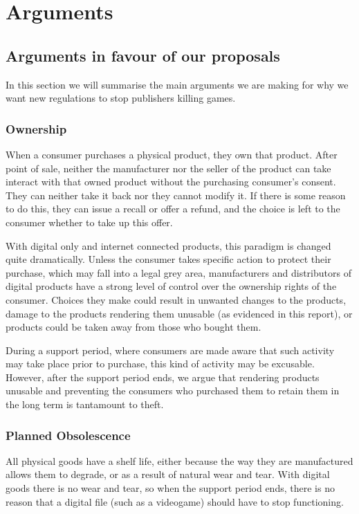 \chapter{Arguments}

\section{Arguments in favour of our proposals}
In this section we will summarise the main arguments we are making for why we want new regulations to stop publishers killing games.

\subsection{Ownership}
When a consumer purchases a physical product, they own that product.
After point of sale, neither the manufacturer nor the seller of the product can take interact with that owned product without the purchasing consumer's consent.
They can neither take it back nor they cannot modify it.
If there is some reason to do this, they can issue a recall or offer a refund, and the choice is left to the consumer whether to take up this offer.

With digital only and internet connected products, this paradigm is changed quite dramatically.
Unless the consumer takes specific action to protect their purchase,
which may fall into a legal grey area,
manufacturers and distributors of digital products have a strong level of control over the ownership rights of the consumer.
Choices they make could result in unwanted changes to the products\cn,
damage to the products rendering them unusable (as evidenced in this report),
or products could be taken away from those who bought them\cn.

During a support period, where consumers are made aware that such activity may take place prior to purchase, this kind of activity may be excusable.
However, after the support period ends, we argue that rendering products unusable and preventing the consumers who purchased them to retain them in the long term is tantamount to theft.

\subsection{Planned Obsolescence}
All physical goods have a shelf life, either because the way they are manufactured allows them to degrade, or as a result of natural wear and tear.
With digital goods there is no wear and tear, so when the support period ends, there is no reason that a digital file (such as a videogame) should have to stop functioning.

